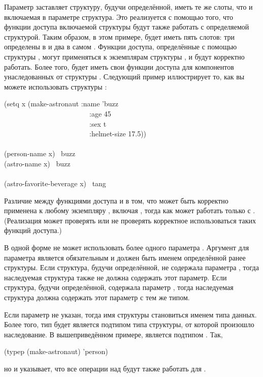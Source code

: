 \begin{flushdesc}
  Параметр  заставляет структуру, будучи определённой, иметь те же
  слоты, что и включаемая в параметре структура.  Это реализуется с помощью
  того, что функции доступа включаемой структуры будут также работать с
  определяемой структурой.  Таким образом, в этом примере,  будет
  иметь пять слотов: три определены в  и два в самом
  .  Функции доступа, определённые с помощью структуры
  , могут применяться к экземплярам структуры , и
  будут корректно работать.  Более того,  будет иметь свои
  функции доступа для компонентов унаследованных от структуры .
  Следующий пример иллюстрирует то, как вы можете использовать структуры
  :
  \begin{lisp}
    (setq x (make-astronaut :name 'buzz \\
    ~~~~~~~~~~~~~~~~~~~~~~~~:age 45 \\
    ~~~~~~~~~~~~~~~~~~~~~~~~:sex t \\
    ~~~~~~~~~~~~~~~~~~~~~~~~:helmet-size 17.5)) \\
    \\
    (person-name x) \EV\ buzz \\
    (astro-name x) \EV\ buzz \\
    \\
    (astro-favorite-beverage x) \EV\ tang
  \end{lisp}
  Различие между функциями доступа  и  в том,
  что  может быть корректно применена к любому экземпляру
  , включая , тогда как  может
  работать только с . (Реализация может проверять или не
  проверять корректное использоваться таких функций доступа.)

  В одной форме  не может использовать более одного параметра
  .  Аргумент для параметра  является обязательным и
  должен быть именем определённой ранее структуры. Если структура, будучи
  определённой, не содержала параметра , тогда наследуемая структура
  также не должна содержать этот параметр.  Если структура, будучи определённой,
  содержала параметр , тогда наследуемая структура должна содержать
  этот параметр с тем же типом.

  Если параметр  не указан, тогда имя структуры становиться именем
  типа данных. Более того, тип будет является подтипом типа структуры, от
  которой произошло наследование. В вышеприведённом примере, 
  является подтипом . Так,
  \begin{lisp}
    (typep (make-astronaut) 'person)
  \end{lisp}
  но и указывает, что все операции над  будут также работать для
  .


\end{flushdesc}
